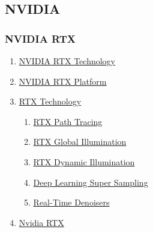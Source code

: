 \subsection{NVIDIA}
\begin{frame}\frametitle{NVIDIA RTX}
\begin{enumerate}
	\item \href{https://www.nvidia.com/en-us/design-visualization/technologies/rtx/}{NVIDIA RTX Technology} 
	\item \href{https://developer.nvidia.com/rtx/}{NVIDIA RTX Platform} 
	\item \href{https://developer.nvidia.com/rtx/ray-tracing}{RTX Technology} 
	\begin{enumerate}
		\item \href{https://developer.nvidia.com/rtx/path-tracing/}{RTX Path Tracing}
		\item \href{https://developer.nvidia.com/rtxgi}{RTX Global Illumination}
		\item \href{https://developer.nvidia.com/rtxdi}{RTX Dynamic Illumination}
		\item \href{https://developer.nvidia.com/rtx/dlss}{Deep Learning Super Sampling}
		\item \href{https://developer.nvidia.com/nvidia-rt-denoiser}{Real-Time Denoisers}
	\end{enumerate}
%
	\item \href{https://en.wikipedia.org/wiki/Nvidia_RTX}{Nvidia RTX} 
\end{enumerate}
\end{frame}



